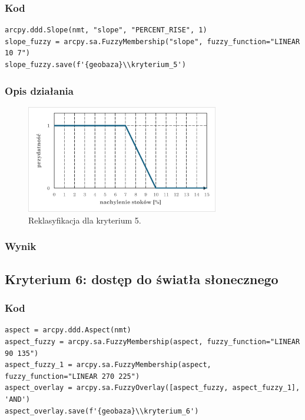 \documentclass{article}
\begin{document}
\subsubsection{Kod}
\begin{lstlisting}
arcpy.ddd.Slope(nmt, "slope", "PERCENT_RISE", 1)
slope_fuzzy = arcpy.sa.FuzzyMembership("slope", fuzzy_function="LINEAR 10 7")
slope_fuzzy.save(f'{geobaza}\\kryterium_5')
\end{lstlisting}

\subsubsection{Opis działania}
\begin{figure}[H]
    \centering
    \includegraphics[width=0.75\textwidth]{img/kryterium5-wykres-glowny.png}
    \caption*{Reklasyfikacja dla kryterium 5.}
\end{figure}
\subsubsection{Wynik}
\newpage
\subsection{Kryterium 6: dostęp do światła słonecznego}
\subsubsection{Kod}
\begin{lstlisting}
aspect = arcpy.ddd.Aspect(nmt)
aspect_fuzzy = arcpy.sa.FuzzyMembership(aspect, fuzzy_function="LINEAR 90 135")
aspect_fuzzy_1 = arcpy.sa.FuzzyMembership(aspect, fuzzy_function="LINEAR 270 225")
aspect_overlay = arcpy.sa.FuzzyOverlay([aspect_fuzzy, aspect_fuzzy_1], 'AND')
aspect_overlay.save(f'{geobaza}\\kryterium_6')
\end{lstlisting}
\end{document}
